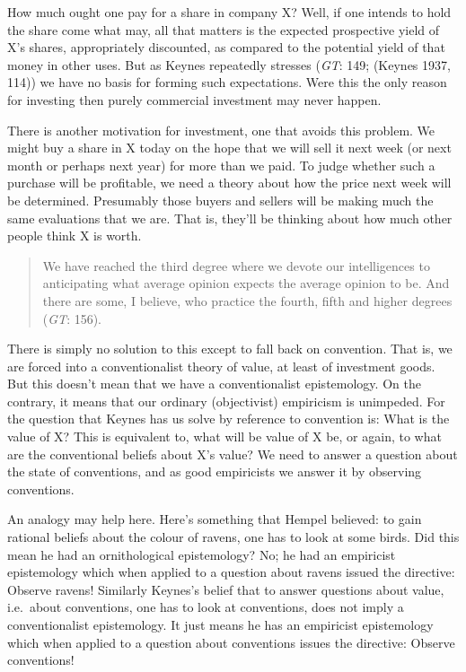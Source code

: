 \documentclass[noflushend]{philosophersimprint}
\begin{document}
How much ought one pay for a share in company X? Well, if one intends to
hold the share come what may, all that matters is the expected
prospective yield of X's shares, appropriately discounted, as compared
to the potential yield of that money in other uses. But as Keynes
repeatedly stresses (\emph{GT}: 149; (Keynes 1937, 114)) we have no
basis for forming such expectations. Were this the only reason for
investing then purely commercial investment may never happen.

There is another motivation for investment, one that avoids this
problem. We might buy a share in X today on the hope that we will sell
it next week (or next month or perhaps next year) for more than we paid.
To judge whether such a purchase will be profitable, we need a theory
about how the price next week will be determined. Presumably those
buyers and sellers will be making much the same evaluations that we are.
That is, they'll be thinking about how much other people think X is
worth.

\begin{quote}
We have reached the third degree where we devote our intelligences to
anticipating what average opinion expects the average opinion to be. And
there are some, I believe, who practice the fourth, fifth and higher
degrees (\emph{GT}: 156).
\end{quote}

There is simply no solution to this except to fall back on convention.
That is, we are forced into a conventionalist theory of value, at least
of investment goods. But this doesn't mean that we have a
conventionalist epistemology. On the contrary, it means that our
ordinary (objectivist) empiricism is unimpeded. For the question that
Keynes has us solve by reference to convention is: What is the value of
X? This is equivalent to, what will be value of X be, or again, to what
are the conventional beliefs about X's value? We need to answer a
question about the state of conventions, and as good empiricists we
answer it by observing conventions.

An analogy may help here. Here's something that Hempel believed: to gain
rational beliefs about the colour of ravens, one has to look at some
birds. Did this mean he had an ornithological epistemology? No; he had
an empiricist epistemology which when applied to a question about ravens
issued the directive: Observe ravens! Similarly Keynes's belief that to
answer questions about value, i.e.~about conventions, one has to look at
conventions, does not imply a conventionalist epistemology. It just
means he has an empiricist epistemology which when applied to a question
about conventions issues the directive: Observe conventions!
\end{document}
